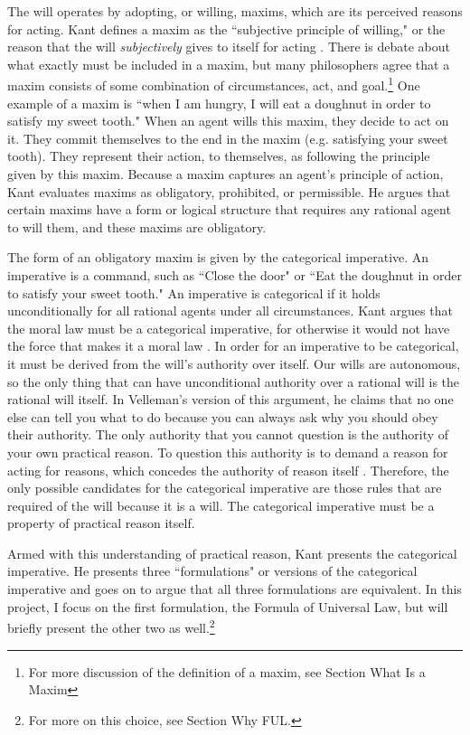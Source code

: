 \begin{isabellebody}
\begin{isamarkuptext}
The will operates by adopting, or willing, maxims, which are its perceived reasons for acting. Kant defines a maxim as 
the ``subjective principle of willing," or the reason that the will \emph{subjectively} gives 
to itself for acting \cite[16 footnote 1]{groundwork}. There is debate about what exactly must be 
included in a maxim, but many philosophers agree that a maxim consists of some combination of circumstances, 
act, and goal.\footnote{For more discussion of the definition of a maxim, see Section What Is a Maxim}
One example of a maxim is ``when I am hungry, I will eat a doughnut in order to satisfy my sweet tooth." 
When an agent wills this maxim, they decide to act on it. They commit themselves to the end in the maxim 
(e.g. satisfying your sweet tooth). They represent their action, to themselves, as following the 
principle given by this maxim. Because a maxim captures an agent's principle of action, Kant evaluates
maxims as obligatory, prohibited, or permissible. He argues that certain maxims have a form or logical structure 
that requires any rational agent to will them, and these maxims are obligatory. 

The form of an obligatory maxim is given by the categorical imperative. 
An imperative is a command, such as ``Close the door" or ``Eat the doughnut in order to satisfy your 
sweet tooth." An imperative is categorical if it holds unconditionally for all rational agents under all 
circumstances. Kant argues that the moral law must be a categorical imperative, for otherwise it would 
not have the force that makes it a moral law \cite[5]{groundwork}. In order for an imperative to be 
categorical, it must be derived from the will's authority over itself. Our wills are autonomous, so 
the only thing that can have unconditional authority over a rational will is 
the rational will itself. In Velleman's version of this argument, he claims that no one else can tell you what 
to do because you can always ask why you 
should obey their authority. The only authority that you cannot question is the authority of your own 
practical reason. To question this authority is to demand a reason for acting for reasons, which 
concedes the authority of reason itself \cite[23]{velleman}. Therefore, the only possible candidates 
for the categorical imperative are those rules that are required of the will because it is a will. 
The categorical imperative must be a property of practical reason itself.

Armed with this understanding of practical reason, Kant presents the categorical 
imperative. He presents three ``formulations" or versions of the categorical imperative and goes on to 
argue that all three formulations are equivalent. In this project, I focus on the first formulation,
the Formula of Universal Law, but will briefly present the other two as well.\footnote{For more on this 
choice, see Section Why FUL.}


\end{isamarkuptext}
\end{isabellebody}
